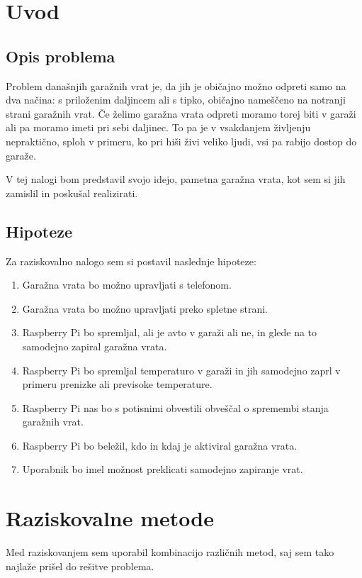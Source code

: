 \documentclass[11pt]{article}
\begin{document}

\newpage
{}
\setcounter{page}{6}
\section{Uvod}
\subsection{Opis problema}
Problem današnjih garažnih vrat je, da jih je običajno možno odpreti samo na dva načina: s priloženim daljincem ali s tipko, običajno nameščeno na notranji strani garažnih vrat. Če želimo garažna vrata odpreti moramo torej biti v garaži ali pa moramo imeti pri sebi daljinec. To pa je v vsakdanjem življenju nepraktično, sploh v primeru, ko pri hiši živi veliko ljudi, vsi pa rabijo dostop do garaže.

V tej nalogi bom predstavil svojo idejo, pametna garažna vrata, kot sem si jih zamislil in poskušal realizirati.

\subsection{Hipoteze}
Za raziskovalno nalogo sem si postavil naslednje hipoteze:
\begin{enumerate}
    \item Garažna vrata bo možno upravljati s telefonom.
    \item Garažna vrata bo možno upravljati preko spletne strani.
    \item Raspberry Pi bo spremljal, ali je avto v garaži ali ne, in glede na to samodejno zapiral garažna vrata.
    \item Raspberry Pi bo spremljal temperaturo v garaži in jih samodejno zaprl v primeru prenizke ali previsoke temperature.
    \item Raspberry Pi nas bo s potisnimi obvestili obveščal o spremembi stanja garažnih vrat.
    \item Raspberry Pi bo beležil, kdo in kdaj je aktiviral garažna vrata.
    \item Uporabnik bo imel možnost preklicati samodejno zapiranje vrat.
\end{enumerate}

\section{Raziskovalne metode}
Med raziskovanjem sem uporabil kombinacijo različnih metod, saj sem tako najlaže prišel do rešitve problema.
\end{document}
